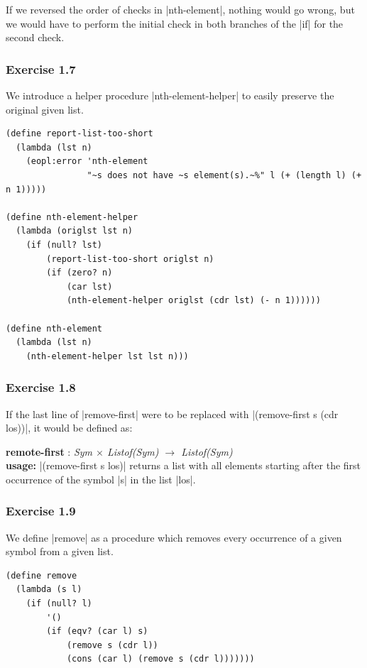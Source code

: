 \documentclass[a4paper]{article}
\begin{document}
If we reversed the order of checks in |nth-element|, nothing would go wrong, but we would have to perform the initial check in both branches of the |if| for the second check.

\subsubsection{Exercise 1.7}

We introduce a helper procedure |nth-element-helper| to easily preserve the original given list.

\begin{lstlisting}
(define report-list-too-short
  (lambda (lst n)
    (eopl:error 'nth-element
                "~s does not have ~s element(s).~%" l (+ (length l) (+ n 1)))))

(define nth-element-helper
  (lambda (origlst lst n)
    (if (null? lst)
        (report-list-too-short origlst n)
        (if (zero? n)
            (car lst)
            (nth-element-helper origlst (cdr lst) (- n 1))))))

(define nth-element
  (lambda (lst n)
    (nth-element-helper lst lst n)))
\end{lstlisting}

\subsubsection{Exercise 1.8}

If the last line of |remove-first| were to be replaced with |(remove-first s (cdr los))|, it would be defined as:

\textbf{remote-first} : \textit{Sym $\times$ Listof(Sym) $\rightarrow$ Listof(Sym)}\\
\textbf{usage:} |(remove-first s los)| returns a list with all elements starting after the first occurrence of the symbol |s| in the list |los|.

\subsubsection{Exercise 1.9}

We define |remove| as a procedure which removes every occurrence of a given symbol from a given list.

\begin{lstlisting}
(define remove
  (lambda (s l)
    (if (null? l)
        '()
        (if (eqv? (car l) s)
            (remove s (cdr l))
            (cons (car l) (remove s (cdr l)))))))
\end{lstlisting}
\end{document}
